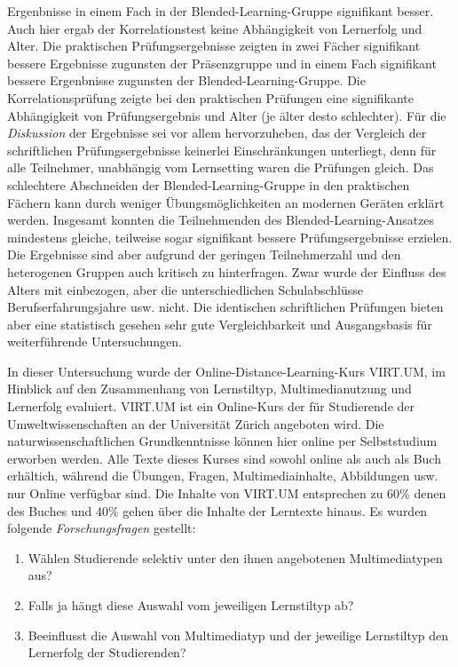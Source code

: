 Ergenbnisse in einem Fach in der Blended-Learning-Gruppe signifikant
besser. Auch hier ergab der Korrelationstest keine Abhängigkeit von
Lernerfolg und Alter. Die praktischen Prüfungsergebnisse zeigten in zwei
Fächer signifikant bessere Ergebnisse zugunsten der Präsenzgruppe und in
einem Fach signifikant bessere Ergenbnisse zugunsten der
Blended-Learning-Gruppe. Die Korrelationsprüfung zeigte bei den
praktischen Prüfungen eine signifikante Abhängigkeit von
Prüfungsergebnis und Alter (je älter desto schlechter). Für die
\emph{Diskussion} der Ergebnisse sei vor allem hervorzuheben, das der
Vergleich der schriftlichen Prüfungsergebnisse keinerlei Einschränkungen
unterliegt, denn für alle Teilnehmer, unabhängig vom Lernsetting waren
die Prüfungen gleich. Das schlechtere Abschneiden der
Blended-Learning-Gruppe in den praktischen Fächern kann durch weniger
Übungsmöglichkeiten an modernen Geräten erklärt werden. Insgesamt
konnten die Teilnehmenden des Blended-Learning-Ansatzes mindestens
gleiche, teilweise sogar signifikant bessere Prüfungsergebnisse
erzielen. Die Ergebnisse sind aber aufgrund der geringen Teilnehmerzahl
und den heterogenen Gruppen auch kritisch zu hinterfragen. Zwar wurde
der Einfluss des Alters mit einbezogen, aber die unterschiedlichen
Schulabschlüsse Berufserfahrungsjahre usw. nicht. Die identischen
schriftlichen Prüfungen bieten aber eine statistisch gesehen sehr gute
Vergleichbarkeit und Ausgangsbasis für weiterführende Untersuchungen.

\textbf{}

In dieser Untersuchung wurde der Online-Distance-Learning-Kurs VIRT.UM,
im Hinblick auf den Zusammenhang von Lernstiltyp, Multimedianutzung und
Lernerfolg evaluiert. VIRT.UM ist ein Online-Kurs der für Studierende
der Umweltwissenschaften an der Universität Zürich angeboten wird. Die
naturwissenschaftlichen Grundkenntnisse können hier online per
Selbststudium erworben werden. Alle Texte dieses Kurses sind sowohl
online als auch als Buch erhältich, während die Übungen, Fragen,
Multimediainhalte, Abbildungen usw. nur Online verfügbar sind. Die
Inhalte von VIRT.UM entsprechen zu 60\% denen des Buches und 40\% gehen
über die Inhalte der Lerntexte hinaus. Es wurden folgende
\emph{Forschungsfragen} gestellt:

\begin{enumerate}
\def\labelenumi{\arabic{enumi}.}
\itemsep1pt\parskip0pt
\item
  Wählen Studierende selektiv unter den ihnen angebotenen
  Multimediatypen aus?
\item
  Falls ja hängt diese Auswahl vom jeweiligen Lernstiltyp ab?
\item
  Beeinflusst die Auswahl von Multimediatyp und der jeweilige
  Lernstiltyp den Lernerfolg der Studierenden?
\end{enumerate}

